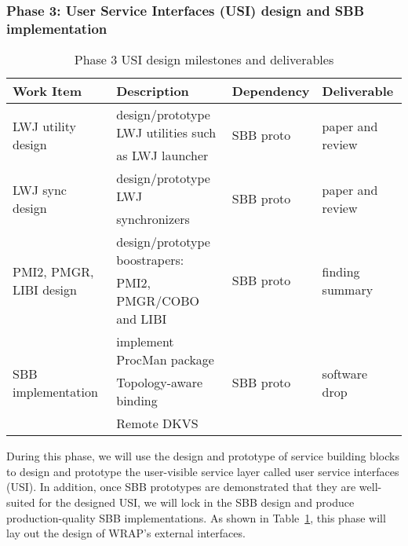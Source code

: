 \subsubsection{Phase 3: User Service Interfaces (USI) design and SBB implementation}
\begin{table}
\centering
\begin{tabular}{|l|l|l|l|}
\hline
Work Item & Description & Dependency & Deliverable \\
\hline
\multirow{2}{*}{LWJ utility design} & design/prototype LWJ utilities such & \multirow{2}{*}{SBB proto} & \multirow{2}{*}{paper and review} \\
& as LWJ launcher & & \\ \hline
\multirow{2}{*}{LWJ sync design} & design/prototype LWJ & \multirow{2}{*}{SBB proto} & \multirow{2}{*}{paper and review} \\
& synchronizers & & \\ \hline
\multirow{2}{*}{PMI2, PMGR, LIBI design} & design/prototype boostrapers: & \multirow{2}{*}{SBB proto} & \multirow{2}{*}{finding summary} \\
& PMI2, PMGR/COBO and LIBI & & \\ \hline
\multirow{3}{*}{SBB implementation} & implement ProcMan package & \multirow{3}{*}{SBB proto} & \multirow{3}{*}{software drop} \\
& Topology-aware binding & & \\
& Remote DKVS & & \\ \hline
\end{tabular}
\caption{Phase 3 USI design milestones and deliverables}
\label{tab:phase3}
\end{table}

During this phase, we will use the design and prototype of service building blocks
to design and prototype the user-visible service layer called user service interfaces (USI).
In addition, once SBB prototypes are demonstrated that they are well-suited for the designed USI,
we will lock in the SBB design and produce production-quality SBB implementations.
As shown in Table~\ref{tab:phase3},
this phase will lay out the design of WRAP's external interfaces.

